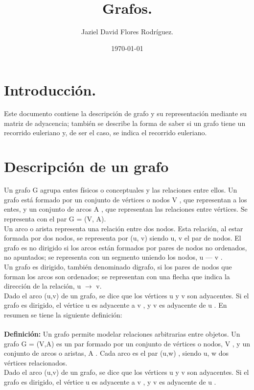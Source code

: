 \documentclass[12pt, A4]{article}
\author{Jaziel David Flores Rodríguez.}
\date{\today}
\title{Grafos.}
\begin{document}
	\maketitle

\section{Introducción.}
 Este documento contiene la descripción de grafo y su representación mediante su matriz de adyacencia; también se describe la forma de saber si un grafo tiene un recorrido euleriano y, de ser el caso, se indica  el recorrido euleriano.


\section{Descripción de un grafo}
Un grafo G agrupa entes físicos o conceptuales y las relaciones entre ellos. Un grafo está formado por un conjunto de vértices o nodos V , que representan a los entes, y un conjunto de arcos A ,
que representan las relaciones entre vértices. Se representa con el par G = (V, A).\\
Un arco o arista representa una relación entre dos nodos. Esta relación, al estar formada
por dos nodos, se representa por (u, v) siendo u, v el par de nodos. El grafo es no dirigido si
los arcos están formados por pares de nodos no ordenados, no apuntados; se representa con un
segmento uniendo los nodos, u — v .\\
Un grafo es dirigido, también denominado digrafo, si los pares de nodos que forman los arcos
son ordenados; se representan con una flecha que indica la dirección de la relación, u $\rightarrow$ v.\\
Dado el arco (u,v) de un grafo, se dice que los vértices u y v son adyacentes. Si el grafo es
dirigido, el vértice u es adyacente a v , y v es adyacente de u . En resumen se tiene la siguiente definición:\\\\
\textbf{Definición: } Un grafo permite modelar relaciones arbitrarias entre objetos. Un grafo G = (V,A) es un
par formado por un conjunto de vértices o nodos, V , y un conjunto de arcos o aristas, A .
Cada arco es el par (u,w) , siendo u, w dos vértices relacionados.\\Dado el arco (u,v) de un grafo, se dice que los vértices u y v son adyacentes. Si el grafo es
dirigido, el vértice u es adyacente a v , y v es adyacente de u .
\end{document}
